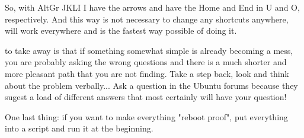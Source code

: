 \par So, with AltGr JKLI I have the arrows and have the Home and End in U and O, respectively. And this way is not necessary to change any shortcuts anywhere, will work everywhere and is the fastest way possible of doing it.

\par {} to take away is that if something somewhat simple is already becoming a mess, you are probably asking the wrong questions and there is a much shorter and more pleasant path that you are not finding. Take a step back, look and think about the problem verbally... Ask a question in the Ubuntu forums because they sugest a load of different answers that most certainly will have your question!



\vspace{1cm}

One last thing: if you want to make everything "reboot proof", put everything into a script and run it at the beginning.



